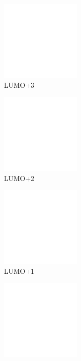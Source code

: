 \begin{figure}[!ht]
 \centering
 \begin{subfigure}[b]{0.31\textwidth}
  \includegraphics[clip=true, width=\textwidth, height=39mm, keepaspectratio]{images/mos/8l+3.eps}
  \caption{LUMO+3}
 \end{subfigure}
 \begin{subfigure}[b]{0.31\textwidth}
  \includegraphics[clip=true, width=\textwidth, height=39mm, keepaspectratio]{images/mos/8l+2.eps}
  \caption{LUMO+2}
 \end{subfigure}
  \begin{subfigure}[b]{0.31\textwidth}
  \includegraphics[clip=true, width=\textwidth, height=39mm, keepaspectratio]{images/mos/8l+1.eps}
  \caption{LUMO+1}
 \end{subfigure}
  \begin{subfigure}[b]{0.31\textwidth}
  \includegraphics[clip=true, width=\textwidth, height=39mm, keepaspectratio]{images/mos/8l.eps}

\end{subfigure}
\end{figure}
